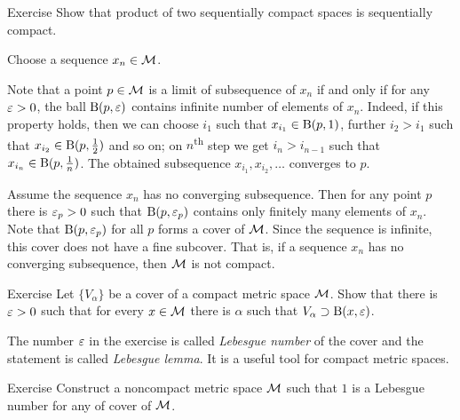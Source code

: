 {\sloppy

\begin{thm}{Exercise}\label{ex:product-sequentially-compact}
Show that product of two sequentially compact spaces is sequentially compact.
\end{thm}

}

Choose a sequence $x_n\in \mathcal{M}$.

Note that a point $p\in \mathcal{M}$ is a limit of subsequence of $x_n$ if and only if for any $\varepsilon>0$, the ball $\mathrm{B}(p,\varepsilon)$ contains infinite number of elements of $x_n$.
Indeed, if this property holds, then we can choose $i_1$ such that $x_{i_1}\in \mathrm{B}(p,1)$, further $i_2>i_1$ such that $x_{i_2}\in \mathrm{B}(p,\tfrac12)$ and so on; on $n$\textsuperscript{th} step we get $i_n>i_{n-1}$ such that $x_{i_n}\in \mathrm{B}(p,\tfrac1n)$.
The obtained subsequence $x_{i_1},x_{i_2},\dots$ converges to $p$.

Assume the sequence $x_n$ has no converging subsequence.
Then for any point $p$ there is $\varepsilon_p>0$ such that $\mathrm{B}(p,\varepsilon_p)$ contains only finitely many elements of $x_n$.
Note that $\mathrm{B}(p,\varepsilon_p)$ for all $p$ forms a cover of $\mathcal{M}$.
Since the sequence is infinite, this cover does not have a fine subcover.
That is, if a sequence $x_n$ has no converging subsequence, then $\mathcal{M}$ is not compact.
\qeds


\begin{thm}{Exercise}\label{ex:lebesgue-number}
Let $\{V_\alpha\}$ be a cover of a compact metric space $\mathcal{M}$.
Show that there is $\varepsilon > 0$ such that for every $x\in\mathcal{M}$ there is $\alpha$ such that $V_\alpha\supset \mathrm{B}(x,\varepsilon)$.
\end{thm}


The number $\varepsilon$ in the exercise is called \emph{Lebesgue number} of the cover and the statement is called \emph{Lebesgue lemma}.
It is a useful tool for compact metric spaces.

\begin{thm}{Exercise}\label{ex:lebesgue=1}
Construct a noncompact metric space $\mathcal{M}$ such that $1$ is a Lebesgue number for any of cover of $\mathcal{M}$. 
\end{thm}

